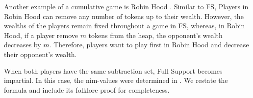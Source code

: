 \documentclass[oneside,reqno]{amsart}
\newcommand{\fs}{\mathcal{F}}
\begin{document}
Another example of a cumulative game is {\sc Robin Hood} \cite{BDL}. %
Similar to {\sc FS}, Players in {\sc Robin Hood} can remove any number of tokens up to their wealth. However, the wealths of the players remain fixed throughout a game in {\sc FS}, whereas, in {\sc Robin Hood}, if a player remove $m$ tokens from the heap, the opponent's wealth decreases by $m$. Therefore, players want to play first in {\sc Robin Hood} and decrease their opponent's wealth. 









When both players have the same subtraction set, {\sc Full Support} becomes impartial. In this case, the nim-values were determined in \cite{BCG2004}. We restate the formula and include its folklore proof for completeness.

\end{document}
